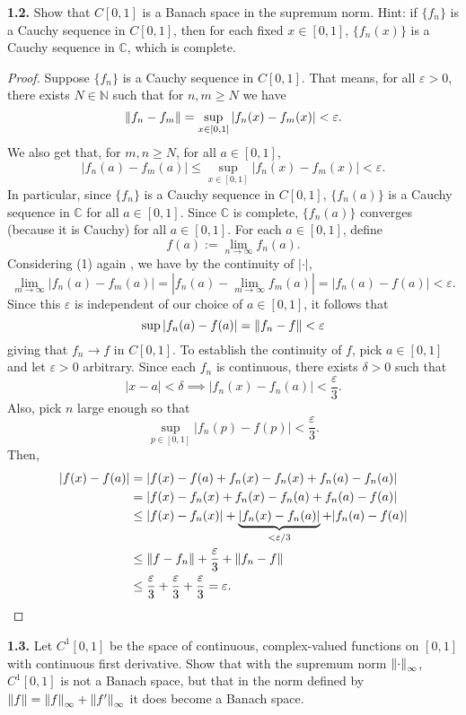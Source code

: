 \documentclass[12pt]{article}
\theoremstyle{definition}
\begin{document}
	\newpage 
	\noindent \textbf{1.2.} Show that $C[0, 1]$ is a Banach space in the supremum norm. Hint: if $\{f_n\}$ is a Cauchy sequence in $C[0, 1]$, then for each fixed $x \in [0, 1]$, $\{f_n(x)\}$ is a Cauchy sequence in $\mathbb{C}$, which is complete.
		\begin{proof}
			Suppose $\{f_n\}$ is a Cauchy sequence in $C[0, 1]$. That means, for all $\varepsilon > 0$, there exists $N \in \mathbb{N}$ such that for $n, m \geq N$ we have $$\norm{f_n - f_m} = \sup_{x \in [0, 1]}|f_n(x) - f_m(x)| < \varepsilon.$$ We also get that, for $m, n \geq N$, for all $a \in [0, 1]$,  \begin{equation} |f_n(a) - f_m(a)| \leq \sup_{x \in [0, 1]} |f_n(x) - f_m(x)| < \varepsilon.\end{equation} In particular, since $\{f_n\}$ is a Cauchy sequence in $C[0, 1]$, $\{f_n(a)\}$ is a Cauchy sequence in $\mathbb{C}$ for all $a \in [0, 1]$. Since $\mathbb{C}$ is complete, $\{f_n(a)\}$ converges (because it is Cauchy) for all $a \in [0, 1]$. For each $a \in [0, 1]$, define $$f(a) := \lim_{n \to \infty} f_n(a).$$ Considering (1) again , we have by the continuity of $|\cdot|$,  $$\lim_{m \to \infty} |f_n(a) - f_m(a)| = |f_n(a) - \lim_{m \to \infty} f_m(a)| = |f_n(a) - f(a)| < \varepsilon.$$ Since this $\varepsilon$ is independent of our choice of $a \in [0, 1]$, it follows that $$\sup |f_n(a) - f(a)| = \norm{f_n - f} < \varepsilon$$ giving that $f_n \to f$ in $C[0, 1]$. To establish the continuity of $f$, pick $a \in [0, 1]$ and let $\varepsilon > 0$ arbitrary. Since each $f_n$ is continuous, there exists $\delta > 0$ such that $$|x - a| < \delta \implies |f_n(x) - f_n(a)| < \frac{\varepsilon}{3}.$$ Also, pick $n$ large enough so that  $$\sup_{p \in [0, 1]}|f_n(p) - f(p)| < \frac{\varepsilon}{3}.$$ Then,
				\begin{align*}
					|f(x) - f(a)| &= |f(x) - f(a) + f_n(x) - f_n(x) + f_n(a) - f_n(a)| \\
					&= |f(x) - f_n(x) + f_n(x) - f_n(a) +f_n(a) - f(a)| \\
					&\leq |f(x) - f_n(x)| + \underbrace{|f_n(x) - f_n(a)|}_{< \varepsilon/3} + |f_n(a) - f(a)| \\
					&\leq \norm{f - f_n} + \frac{\varepsilon}{3} + \norm{f_n - f} \\
					&\leq \frac{\varepsilon}{3} + \frac{\varepsilon}{3} + \frac{\varepsilon}{3} = \varepsilon.
				\end{align*}
		\end{proof} 
	\newpage 
	\noindent \textbf{1.3.} Let $C^1[0, 1]$ be the space of continuous, complex-valued functions on $[0, 1]$ with continuous first derivative. Show that with the supremum norm $\norm{\cdot}_\infty$, $C^1[0, 1]$ is not a Banach space, but that in the norm defined by $\norm{f} = \norm{f}_\infty + \norm{f'}_\infty$ it does become a Banach space. 
\end{document}
